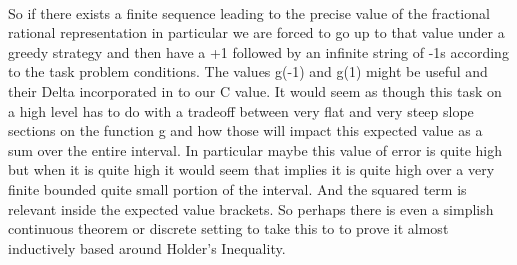 
 \\
So if there exists a finite sequence leading to the precise value of the fractional rational representation in particular we are forced to go up to that value under a greedy strategy and then have a +1 followed by an infinite string of -1s according to the task problem conditions. The values g(-1) and g(1) might be useful and their Delta incorporated in to our C value. It would seem as though this task on a high level has to do with a tradeoff between very flat and very steep slope sections on the function g and how those will impact this expected value as a sum over the entire interval. In particular maybe this value of error is quite high but when it is quite high it would seem that implies it is quite high over a very finite bounded quite small portion of the interval. And the squared term is relevant inside the expected value brackets. So perhaps there is even a simplish continuous theorem or discrete setting to take this to to prove it almost inductively based around Holder's Inequality.

